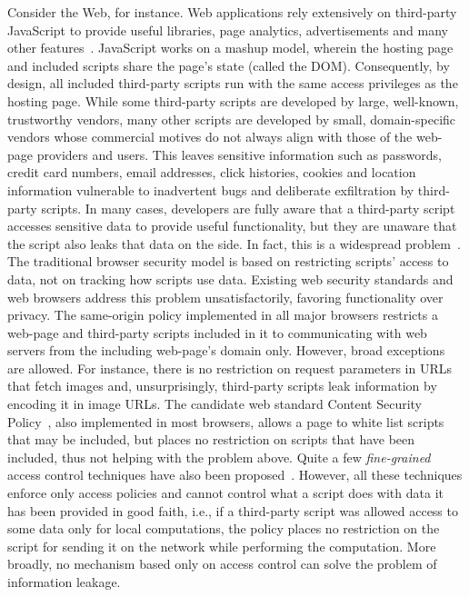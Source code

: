 Consider the Web, for instance. Web applications rely extensively on
third-party JavaScript to provide useful libraries, page analytics,
advertisements and many other features~\cite{nick12CCS}. JavaScript
works on a mashup model, wherein the hosting page and included scripts
share the page’s state (called the DOM). Consequently, by design, all
included third-party scripts run with the same access privileges as
the hosting page. While some third-party scripts are developed by
large, well-known, trustworthy vendors, many other scripts are
developed by small, domain-specific vendors whose commercial motives
do not always align with those of the 
web-page providers and users. This leaves sensitive information such as
passwords, credit card numbers, email addresses, click histories,
cookies and location information vulnerable to inadvertent bugs and
deliberate exfiltration by third-party scripts. In many cases,
developers are fully aware that a third-party script accesses
sensitive data to provide useful functionality, but they are unaware
that the script also leaks that data on the side. In fact, this is a
widespread problem~\cite{jang10CCS}. 
%
The traditional browser security
model is based on restricting scripts’ access to data, not on tracking
how scripts use data. Existing web security standards
and web browsers address this problem unsatisfactorily, favoring
functionality over privacy. The same-origin policy implemented
in all major browsers restricts a web-page and third-party scripts
included in it to communicating with web servers from the including
web-page’s domain only. However, broad exceptions are allowed. For
instance, there is no restriction on request parameters in URLs that
fetch images and, unsurprisingly, third-party scripts leak information
by encoding it in image URLs. The candidate web standard Content
Security Policy~\cite{csp}, also implemented in most browsers,
allows a page to white list scripts that may be included, but places
no restriction on scripts that have been included, thus not helping
with the problem above. 
%
Quite a few \emph{fine-grained} access control
techniques have also been proposed~\cite{conscript, adjail,
  zhouESORICS11, ccs13crypton, adsafe, fbjs, caja, webjail}. 
However, all these techniques enforce only access policies
and cannot control what a script does with data it has been provided
in good faith, i.e., if a third-party script was allowed access to
some data only for local computations, the policy places no
restriction on the script for sending it on the network while
performing the computation. More broadly, no mechanism based only
on access control can solve the problem of information leakage.  

